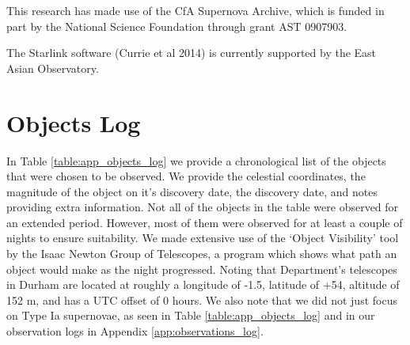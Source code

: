 \documentclass[twocolumn]{revtex4}
\begin{document}
This research has made use of the CfA Supernova Archive, which is funded in part by the National Science Foundation through grant AST 0907903.

The Starlink software (Currie et al 2014) is currently supported by the East Asian Observatory.

\vspace{-3ex}



\clearpage
\onecolumngrid
\vspace{-3ex}
\appendix
\section{Objects Log} \label{app:objects_log}
\vspace{-2ex}
In Table \ref{table:app_objects_log} we provide a chronological list of the objects that were chosen to be observed. We provide the celestial coordinates, the magnitude of the object on it's discovery date, the discovery date, and notes providing extra information. Not all of the objects in the table were observed for an extended period. However, most of them were observed for at least a couple of nights to ensure suitability. We made extensive use of the `Object Visibility' tool by the Isaac Newton Group of Telescopes, a program which shows what path an object would make as the night progressed. Noting that Department's telescopes in Durham are located at roughly a longitude of -1.5, latitude of +54\degree, altitude of 152 m, and has a UTC offset of 0 hours.  We also note that we did not just focus on Type Ia supernovae, as seen in Table \ref{table:app_objects_log} and in our observation logs in Appendix \ref{app:observations_log}.
\end{document}
